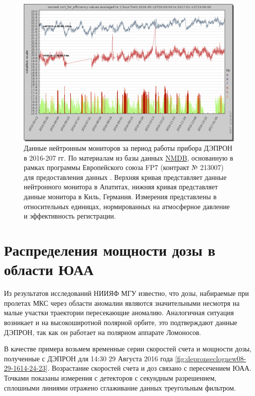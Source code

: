 \begin{figure}
	\centering
	\includegraphics[width=0.7\linewidth]{images/nmdb2016}
	\caption{Данные нейтронным мониторов за период работы прибора ДЭПРОН в 2016-207 гг. По материалам из базы данных \href{www.nmdb.eu}{NMDB}, основанную в рамках программы Европейского союза FP7 (контракт № 213007) для предоставления данных \cite{Ibragimov}. Верхняя кривая представляет данные нейтронного монитора в Апатитах, нижняя кривая представляет данные монитора в Киль, Германия. Измерения представлены в относительных единицах, нормированных на атмосферное давление и эффективность регистрации.}
	\label{fig:nmdb2016}
\end{figure}

\section{Распределения мощности дозы в области ЮАА}
Из результатов исследований НИИЯФ МГУ \cite{Lishnevskii2012} известно, что дозы,  набираемые при пролетах МКС через области аномалии являются значительными несмотря на малые участки траектории пересекающие аномалию. Аналогичная ситуация возникает и на высокоширотной полярной орбите, это подтверждают данные ДЭПРОН, так как он работает на полярном аппарате Ломоносов. 

В качестве примера возьмем временные серии скоростей счета и мощности дозы, полученные с ДЭПРОН для 14:30 29 Августа 2016 года \ref{fig:depronseclognew08-29-1614-24-23}. Возрастание скоростей счета и доз связано с пересечением ЮАА. Точками показаны измерения с детекторов с секундным разрешением, сплошными линиями отражено сглаживание данных треугольным фильтром.

